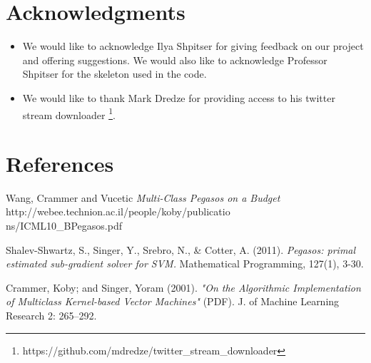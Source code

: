 \documentclass[11pt,letterpaper]{article}
\begin{document}
\section*{Acknowledgments}
\begin{itemize}
\item We would like to acknowledge Ilya Shpitser for giving feedback on our project and offering suggestions. We would also like to acknowledge Professor Shpitser for the skeleton used in the code.
\item We would like to thank Mark Dredze for providing access to his twitter stream downloader \footnote{https://github.com/mdredze/twitter\_stream\_downloader}.
\end{itemize}

\section*{References}
Wang, Crammer and Vucetic \textit{Multi-Class Pegasos on a Budget}
\\http://webee.technion.ac.il/people/koby/publicatio\\ns/ICML10\_BPegasos.pdf

\vspace{1em}

Shalev-Shwartz, S., Singer, Y., Srebro, N., \& Cotter, A. (2011). \textit{Pegasos: primal estimated sub-gradient solver for SVM.} Mathematical Programming, 127(1), 3-30.

\vspace{1em}
Crammer, Koby; and Singer, Yoram (2001). \textit{"On the Algorithmic Implementation of Multiclass Kernel-based Vector Machines"} (PDF). J. of Machine Learning Research 2: 265–292.
\end{document}
